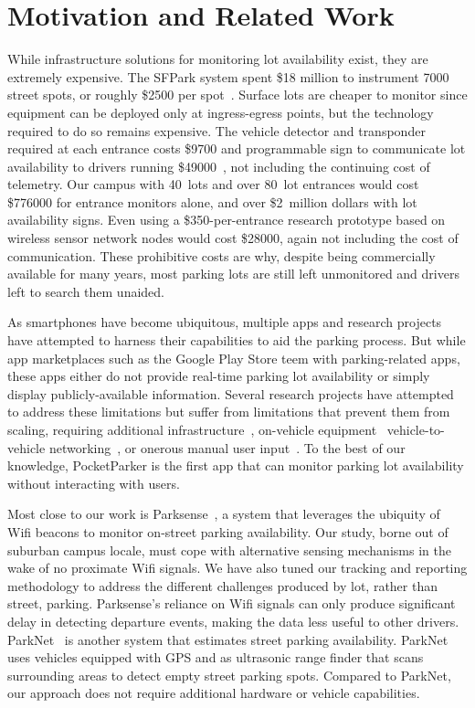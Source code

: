 \section{Motivation and Related Work}

While infrastructure solutions for monitoring lot availability exist, they
are extremely expensive. The SFPark system spent \$18 million to instrument
\num{7000} street spots, or roughly \$\num{2500} per spot~\cite{sfpark}.
Surface lots are cheaper to monitor since equipment can be deployed only at
ingress-egress points, but the technology required to do so remains
expensive. The vehicle detector and transponder required at each entrance
costs \$\num{9700} and programmable sign to communicate lot availability to
drivers running \$\num{49000}~\cite{mstp-park}, not including the continuing
cost of telemetry. Our campus with 40~lots and over 80~lot entrances would
cost \$\num{776000} for entrance monitors alone, and over \$2~million dollars
with lot availability signs. Even using a \$\num{350}-per-entrance research
prototype based on wireless sensor network nodes would cost \$\num{28000},
again not including the cost of communication. These prohibitive costs are
why, despite being commercially available for many years, most parking lots
are still left unmonitored and drivers left to search them unaided.

As smartphones have become ubiquitous, multiple apps and research projects
have attempted to harness their capabilities to aid the parking process. But
while app marketplaces such as the Google Play Store teem with
parking-related apps, these apps either do not provide real-time parking lot
availability or simply display publicly-available information. Several
research projects have attempted to address these limitations but suffer from
limitations that prevent them from scaling, requiring additional
infrastructure~\cite{5062057}, on-vehicle equipment~\cite{Mathur:2010:PDS}
vehicle-to-vehicle networking~\cite{Delot:2009:CRP, Mathur:2010:PDS}, or
onerous manual user input~\cite{Chen:2012:COS}. To the best of our knowledge,
PocketParker is the first app that can monitor parking lot availability
without interacting with users.

Most close to our work is Parksense~\cite{Nawaz:2013:PSB}, a system that
leverages the ubiquity of Wifi beacons to monitor on-street parking
availability. Our study, borne out of suburban campus locale, must cope with
alternative sensing mechanisms in the wake of no proximate Wifi signals. We
have also tuned our tracking and reporting methodology to address the
different challenges produced by lot, rather than street, parking.
Parksense's reliance on Wifi signals can only produce significant delay in
detecting departure events, making the data less useful to other drivers.
ParkNet~\cite{Mathur:2010:PDS} is another system that estimates street
parking availability. ParkNet uses vehicles equipped with GPS and as
ultrasonic range finder that scans surrounding areas to detect empty street
parking spots. Compared to ParkNet, our approach does not require additional
hardware or vehicle capabilities.

